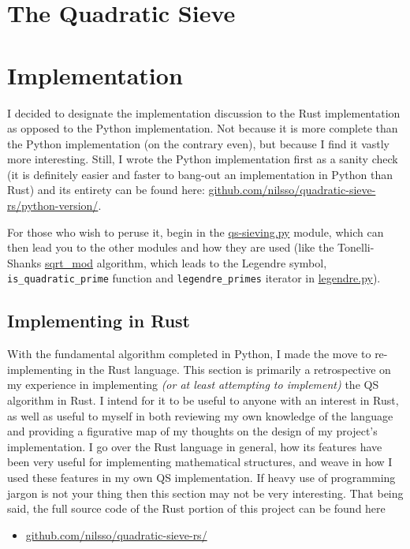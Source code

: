\documentclass{report}
\begin{document}
\chapter{The Quadratic Sieve}

\chapter{Implementation}

I decided to designate the implementation discussion to the Rust implementation
as opposed to the Python implementation. Not because it is more complete than
the Python implementation (on the contrary even), but because I find it vastly
more interesting. Still, I wrote the Python implementation first as a sanity
check (it is definitely easier and faster to bang-out an implementation in
Python than Rust) and its entirety can be found here:
\href{https://github.com/nilsso/quadratic-sieve-rs/tree/main/python-version}{github.com/nilsso/quadratic-sieve-rs/python-version/}.

For those who wish to peruse it, begin in the
\href{https://github.com/nilsso/quadratic-sieve-rs/blob/main/python-version/qs-sieving.py}{qs-sieving.py}
module, which can then lead you to the other modules and how they are used
(like the Tonelli-Shanks
\href{https://github.com/nilsso/quadratic-sieve-rs/blob/main/python-version/sqrt\_mod.py#L22}{sqrt\_mod}
algorithm, which leads to the Legendre symbol, \Verb+is_quadratic_prime+
function and \Verb+legendre_primes+ iterator in
\href{https://github.com/nilsso/quadratic-sieve-rs/blob/main/python-version/legendre.py}{legendre.py}).

\section{Implementing in Rust}

With the fundamental algorithm completed in Python, I made the move to
re-implementing in the Rust language. This section is primarily a
retrospective on my experience in implementing \emph{(or at least
attempting to implement)} the QS algorithm in Rust.
I intend for it to be useful to anyone with an interest in Rust, as well as
useful to myself in both reviewing my own knowledge of the language and
providing a figurative map of my thoughts on the design of my project's
implementation.
I go over the Rust language
in general, how its features have been very useful for implementing mathematical
structures, and weave in how I used these features in my own QS implementation.
If heavy use of programming jargon is not your thing then this section may not
be very interesting.
That being said, the full source code of the Rust portion of this project
can be found here
\begin{itemize}
    \item \href{https://github.com/nilsso/quadratic-sieve-rs/tree/main/src}{github.com/nilsso/quadratic-sieve-rs/}
\end{itemize}
\end{document}
